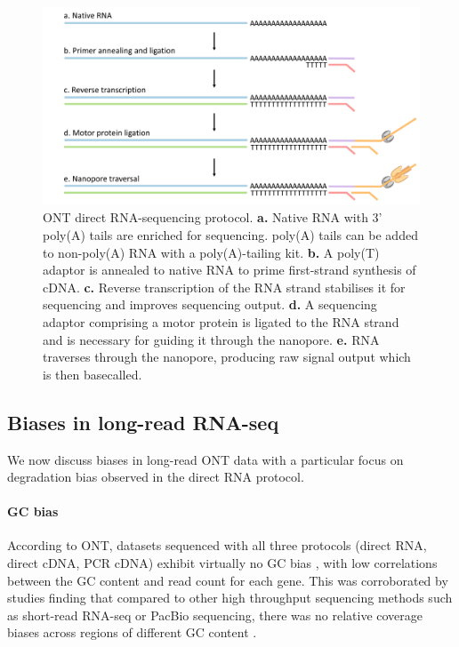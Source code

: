\begin{figure}[H]
    \centering
    \includegraphics[width=\textwidth]{figures/sec-1-drna.png}
    \caption[ONT direct RNA-sequencing protocol]{ONT direct RNA-sequencing protocol. \textbf{a.} Native RNA with 3' poly(A) tails are enriched for sequencing. poly(A) tails can be added to non-poly(A) RNA with a poly(A)-tailing kit. \textbf{b.} A poly(T) adaptor is annealed to native RNA to prime first-strand synthesis of cDNA. \textbf{c.} Reverse transcription of the RNA strand stabilises it for sequencing and improves sequencing output. \textbf{d.} A sequencing adaptor comprising a motor protein is ligated to the RNA strand and is necessary for guiding it through the nanopore. \textbf{e.} RNA traverses through the nanopore, producing raw signal output which is then basecalled.}
    \label{fig:sec-1-drna}
\end{figure}

\subsection{Biases in long-read RNA-seq}

We now discuss biases in long-read ONT data with a particular focus on degradation bias observed in the direct RNA protocol.

\paragraph{GC bias} According to ONT, datasets sequenced with all three protocols (direct RNA, direct cDNA, PCR cDNA) exhibit virtually no GC bias \cite{ONTGC}, with low correlations between the GC content and read count for each gene. This was corroborated by studies finding that compared to other high throughput sequencing methods such as short-read RNA-seq or PacBio sequencing, there was no relative coverage biases across regions of different GC content \cite{Nookaew2017, HTSGC}. 

